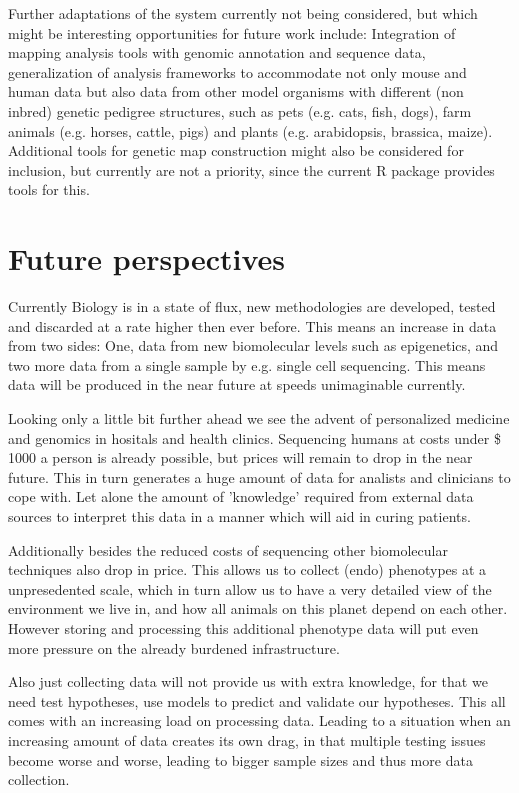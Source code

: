Further adaptations of the system currently not being considered, but which might be interesting opportunities for 
future work include: Integration of mapping analysis tools with genomic annotation and sequence data, generalization 
of analysis frameworks to accommodate not only mouse and human data but also data from other model organisms with 
different (non inbred) genetic pedigree structures, such as pets (e.g. cats, fish, dogs), farm animals (e.g. horses, 
cattle, pigs) and plants (e.g. arabidopsis, brassica, maize). Additional tools for genetic map construction might 
also be considered for inclusion, but currently are not a priority, since the current R package provides tools for 
this.

\section{Future perspectives}
\label{sect:Future}
Currently Biology is in a state of flux, new methodologies are developed, tested and discarded at 
a rate higher then ever before. This means an increase in data from two sides: One, data from new 
biomolecular levels such as epigenetics, and two more data from a single sample by e.g. single cell sequencing. 
This means data will be produced in the near future at speeds unimaginable currently. 

Looking only a little bit further ahead we see the advent of personalized medicine and genomics in hositals 
and health clinics. Sequencing humans at costs under \$ 1000 a person is already possible, but prices will remain 
to drop in the near future. This in turn generates a huge amount of data for analists and clinicians to cope with. 
Let alone the amount of 'knowledge' required from external data sources to interpret this data in a manner which 
will aid in curing patients.

Additionally besides the reduced costs of sequencing other biomolecular techniques also drop in price. 
This allows us to collect (endo) phenotypes at a unpresedented scale, which in turn allow us to have a very 
detailed view of the environment we live in, and how all animals on this planet depend on each other. 
However storing and processing this additional phenotype data will put even more pressure on the 
already burdened infrastructure.

Also just collecting data will not provide us with extra knowledge, for that we need test hypotheses, use 
models to predict and validate our hypotheses. This all comes with an increasing load on processing data. 
Leading to a situation when an increasing amount of data creates its own drag, in that multiple testing 
issues become worse and worse, leading to bigger sample sizes and thus more data collection.

